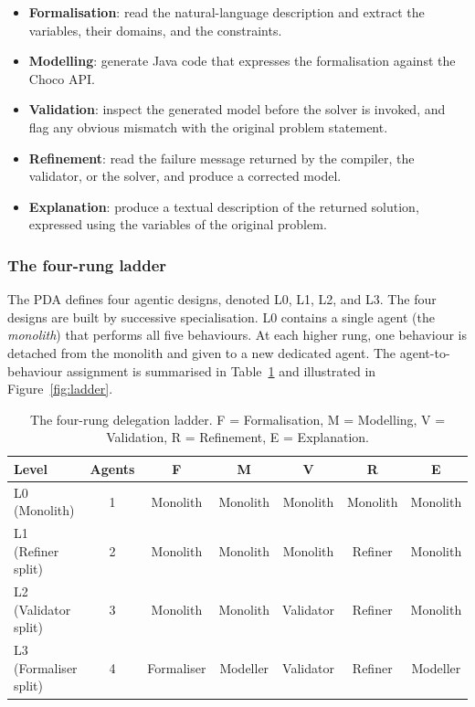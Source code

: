 \documentclass[11pt,a4paper]{article}
\begin{document}
\begin{itemize}[leftmargin=1.4em,topsep=2pt,itemsep=1pt]
  \item \textbf{Formalisation}: read the natural-language description and extract the variables, their domains, and the constraints.
  \item \textbf{Modelling}: generate Java code that expresses the formalisation against the Choco API.
  \item \textbf{Validation}: inspect the generated model before the solver is invoked, and flag any obvious mismatch with the original problem statement.
  \item \textbf{Refinement}: read the failure message returned by the compiler, the validator, or the solver, and produce a corrected model.
  \item \textbf{Explanation}: produce a textual description of the returned solution, expressed using the variables of the original problem.
\end{itemize}

\subsubsection{The four-rung ladder}\label{sec:method:pda:ladder}
The PDA defines four agentic designs, denoted L0, L1, L2, and L3. The four designs are built by successive specialisation. L0 contains a single agent (the \emph{monolith}) that performs all five behaviours. At each higher rung, one behaviour is detached from the monolith and given to a new dedicated agent. The agent-to-behaviour assignment is summarised in Table~\ref{tab:ladder} and illustrated in Figure~\ref{fig:ladder}.

\begin{table}[H]
\centering
\caption{The four-rung delegation ladder. F = Formalisation, M = Modelling, V = Validation, R = Refinement, E = Explanation.}
\label{tab:ladder}
\small
\begin{tabular}{lcccccc}
\toprule
\textbf{Level} & \textbf{Agents} & \textbf{F} & \textbf{M} & \textbf{V} & \textbf{R} & \textbf{E} \\
\midrule
L0 (Monolith)         & 1 & Monolith   & Monolith & Monolith  & Monolith & Monolith \\
L1 (Refiner split)    & 2 & Monolith   & Monolith & Monolith  & Refiner  & Monolith \\
L2 (Validator split)  & 3 & Monolith   & Monolith & Validator & Refiner  & Monolith \\
L3 (Formaliser split) & 4 & Formaliser & Modeller & Validator & Refiner  & Modeller \\
\bottomrule
\end{tabular}
\end{table}
\end{document}
